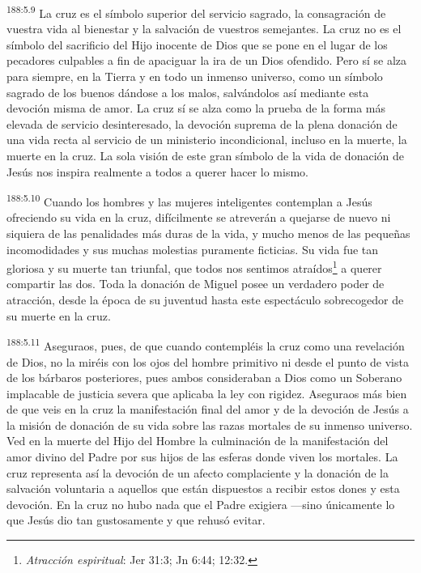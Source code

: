 \par 
\textsuperscript{188:5.9} La cruz es el símbolo superior del servicio sagrado, la consagración de vuestra vida al bienestar y la salvación de vuestros semejantes. La cruz no es el símbolo del sacrificio del Hijo inocente de Dios que se pone en el lugar de los pecadores culpables a fin de apaciguar la ira de un Dios ofendido. Pero sí se alza para siempre, en la Tierra y en todo un inmenso universo, como un símbolo sagrado de los buenos dándose a los malos, salvándolos así mediante esta devoción misma de amor. La cruz sí se alza como la prueba de la forma más elevada de servicio desinteresado, la devoción suprema de la plena donación de una vida recta al servicio de un ministerio incondicional, incluso en la muerte, la muerte en la cruz. La sola visión de este gran símbolo de la vida de donación de Jesús nos inspira realmente a todos a querer hacer lo mismo.

\par 
\textsuperscript{188:5.10} Cuando los hombres y las mujeres inteligentes contemplan a Jesús ofreciendo su vida en la cruz, difícilmente se atreverán a quejarse de nuevo ni siquiera de las penalidades más duras de la vida, y mucho menos de las pequeñas incomodidades y sus muchas molestias puramente ficticias. Su vida fue tan gloriosa y su muerte tan triunfal, que todos nos sentimos atraídos\footnote{\textit{Atracción espiritual}: Jer 31:3; Jn 6:44; 12:32.} a querer compartir las dos. Toda la donación de Miguel posee un verdadero poder de atracción, desde la época de su juventud hasta este espectáculo sobrecogedor de su muerte en la cruz.

\par 
\textsuperscript{188:5.11} Aseguraos, pues, de que cuando contempléis la cruz como una revelación de Dios, no la miréis con los ojos del hombre primitivo ni desde el punto de vista de los bárbaros posteriores, pues ambos consideraban a Dios como un Soberano implacable de justicia severa que aplicaba la ley con rigidez. Aseguraos más bien de que veis en la cruz la manifestación final del amor y de la devoción de Jesús a la misión de donación de su vida sobre las razas mortales de su inmenso universo. Ved en la muerte del Hijo del Hombre la culminación de la manifestación del amor divino del Padre por sus hijos de las esferas donde viven los mortales. La cruz representa así la devoción de un afecto complaciente y la donación de la salvación voluntaria a aquellos que están dispuestos a recibir estos dones y esta devoción. En la cruz no hubo nada que el Padre exigiera ---sino únicamente lo que Jesús dio tan gustosamente y que rehusó evitar.

